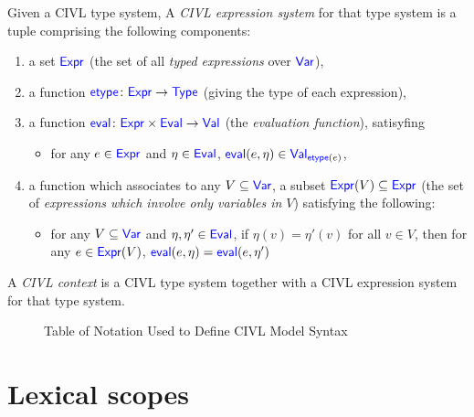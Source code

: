 \documentclass[11pt, oneside, letterpaper]{book}
\begin{document}
\begin{definition}
  Given a CIVL type system, A \emph{CIVL expression system} for that
  type system is a tuple comprising the following components:
  \begin{enumerate}
  \item a set $\Expr$ (the set of all \emph{typed expressions} over
    $\Var$),
  \item a function $\etype\colon\Expr\ra\Type$ (giving the type
    of each expression),
  \item a function
    $\eval\colon\Expr\times\Eval\ra\Val$ (the \emph{evaluation
      function}), satisyfing
    \begin{itemize}
    \item for any $e\in\Expr$ and $\eta\in\Eval$,
      $\eval(e,\eta)\in\Val_{\etype(e)}$,
    \end{itemize}
  \item a function which associates to any $V\subseteq\Var$, a
    subset $\Expr(V)\subseteq\Expr$ (the set of
    \emph{expressions which involve only variables in $V$}) satisfying
    the following:
    \begin{itemize}
    \item for any $V\subseteq\Var$ and $\eta,\eta'\in\Eval$, if
      $\eta(v)=\eta'(v)$ for all $v\in V$, then for any $e\in\Expr(V)$,
      $\eval(e,\eta)=\eval(e,\eta')$
    \end{itemize}
  \end{enumerate}
\end{definition}

\begin{definition}
  A \emph{CIVL context} is a CIVL type system together with
  a CIVL expression system for that type system.
\end{definition}

\begin{figure}
  \notationtable
  \caption{Table of Notation Used to Define CIVL Model Syntax}
  \label{fig:notation}
\end{figure}

\section{Lexical scopes}
\label{sec:scopes}
\end{document}
